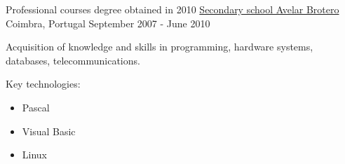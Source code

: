 \begin{cventries}
\cventry
{Professional courses degree obtained in 2010} %
{\href{http://www.brotero.pt/}{Secondary school Avelar Brotero}} %
{Coimbra, Portugal} %
{September 2007 - June 2010} %
{  %
\begin{cvitems}
\item {Acquisition of knowledge and skills in programming, hardware systems, databases, telecommunications.}
\item{Key technologies:}
\begin{itemize}
\item Pascal
\item Visual Basic
\item Linux
\end{itemize}
\end{cvitems}
}



\end{cventries}

\pagebreak